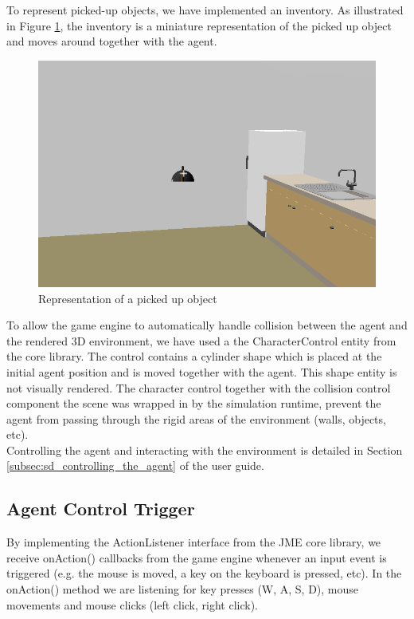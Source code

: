 To represent picked-up objects, we have implemented an inventory. As illustrated in Figure \ref{fig:impl_inventory}, the inventory is a miniature representation of the picked up object and moves around together with the agent.\\
\begin{figure}[H]
	\centering
	\includegraphics[width=0.8\linewidth]{gfx/Chapter4/inventory}
	\caption{Representation of a picked up object}
	\label{fig:impl_inventory}
\end{figure}

To allow the game engine to automatically handle collision between the agent and the rendered 3D environment, we have used a the CharacterControl entity from the core library. The control contains a cylinder shape which is placed at the initial agent position and is moved together with the agent. This shape entity is not visually rendered. The character control together with the collision control component the scene was wrapped in by the simulation runtime, prevent the agent from passing through the rigid areas of the environment (walls, objects, etc).\\

Controlling the agent and interacting with the environment is detailed in Section \ref{subsec:sd_controlling_the_agent} of the user guide.

\subsection{Agent Control Trigger} %
\label{subsec:impl_agent_control}
By implementing the ActionListener interface from the JME core library, we receive onAction() callbacks from the game engine whenever an input event is triggered (e.g. the mouse is moved, a key on the keyboard is pressed, etc). In the onAction() method we are listening for key presses (W, A, S, D), mouse movements and mouse clicks (left click, right click).\\

